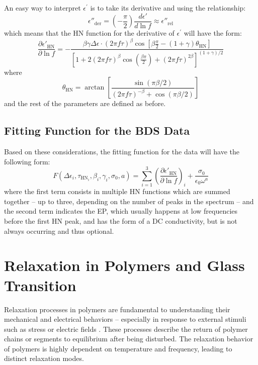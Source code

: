 An easy way to interpret $\epsilon^\prime$ is to take its derivative and using the relationship: \[
\epsilon''_{\text{der}} = \left(-\frac{\pi}{2}\right)\frac{d\epsilon'}{d\ln f} \approx \epsilon''_{\text{rel}}
\]
which means that the HN function for the derivative of $\epsilon^{\prime}$ will have the form: \[
\frac{\partial \epsilon'_{\text{HN}}}{\partial \ln f} = -\frac{\beta \gamma \Delta \epsilon \cdot (2\pi f \tau)^\beta \cos \left[\beta \frac{\pi}{2} - (1+\gamma)\theta_{\text{HN}}\right]}{\left[1 + 2(2\pi f \tau)^\beta \cos \left(\frac{\beta \pi}{2}\right) + (2\pi f \tau)^{2\beta}\right]^{(1+\gamma)/2}}
\]
where \[
\theta_{\text{HN}} = \arctan \left[\frac{\sin(\pi \beta / 2)}{(2\pi f \tau)^{-\beta} + \cos(\pi \beta / 2)}\right]
\]
and the rest of the parameters are defined as before.

\subsection{Fitting Function for the BDS Data}
Based on these considerations, the fitting function for the data will have the following form: \begin{equation}
F(\Delta\epsilon_i, \tau_{\text{HN}_i}, \beta_i, \gamma_i, \sigma_0, a) = \sum_{i=1}^{3} \left(\frac{\partial \epsilon'_{\text{HN}}}{\partial \ln f}\right)_i + \frac{\sigma_0}{\epsilon_0 \omega^a}
\label{eq:der_eps}
\end{equation}
where the first term consists in multiple \ac{HN} functions which are summed together -- up to three, depending on the number of peaks in the spectrum -- and the second term indicates the \ac{EP}, which usually happens at low frequencies before the first \ac{HN} peak, and has the form of a DC conductivity, but is not always occurring and thus optional.
\section{Relaxation in Polymers and Glass Transition}


Relaxation processes in polymers are fundamental to understanding their mechanical and electrical behaviors -- especially in response to external stimuli such as stress or electric fields \cite{LI2021101431}. These processes describe the return of polymer chains or segments to equilibrium after being disturbed. The relaxation behavior of polymers is highly dependent on temperature and frequency, leading to distinct relaxation modes.

